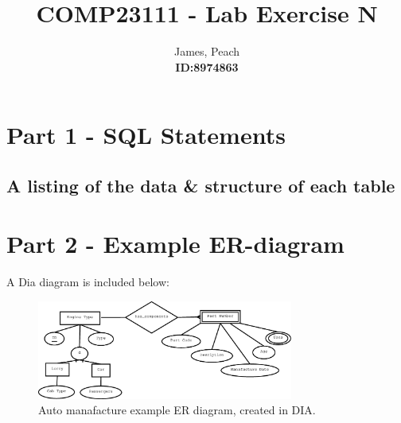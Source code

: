 \documentclass[11pt,a4paper]{article}
\newcommand{\includesqloutput}[1]{\tiny  \normalsize}
\begin{document}
\title{\textbf{COMP23111} - Lab Exercise N}

\author{James, Peach \\ \textbf{ID:8974863} } 


\maketitle
\thispagestyle{empty} %
\newpage %

\section{Part 1 - SQL Statements}

\subsection{A listing of the data \& structure of each table}

\includesqloutput{sqlOutputs/LabEx1Out.lst}

\section{Part 2 - Example ER-diagram}

A Dia diagram is included below:

\begin{figure}[!htbp]      
   	\centering
	\centerline{\includegraphics[width=0.75\textwidth]{./diagrams/AutoManafacture.eps}}
	\caption{Auto manafacture example ER diagram, created in DIA.}
	\label{fig:test-figure}
\end{figure}
\label{LastPage}
\end{document}
